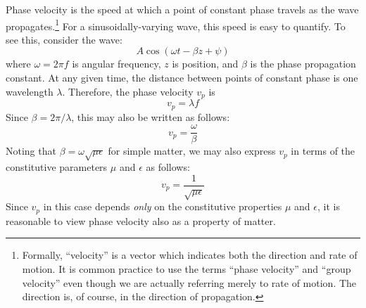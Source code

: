 

\label{m0176_Phase_and_Group_Velocity} %

Phase velocity is the speed at which a point of constant phase travels as the wave propagates.\footnote{Formally, ``velocity'' is a vector which indicates both the direction and rate of motion.  It is common practice to use the terms ``phase velocity'' and ``group velocity'' even though we are actually referring merely to rate of motion.  The direction is, of course, in the direction of propagation.}
For a sinusoidally-varying wave, this speed is easy to quantify.
To see this, consider the wave:
%
\begin{equation}
A\cos\left(\omega t -\beta z + \psi \right)
\label{m0176_ewzt}
\end{equation}
%
where $\omega=2\pi f$ is angular frequency, $z$ is position, and $\beta$ is the phase propagation constant.
At any given time, the distance between points of constant phase is one wavelength $\lambda$.
Therefore, the phase velocity $v_p$ is
%
\begin{equation}
v_p = \lambda f 
\label{m0176_evp}
\end{equation}
%
Since $\beta=2\pi/\lambda$, this may also be written as follows:
%
\begin{equation}
\boxed{
v_p = \frac{\omega}{\beta} 
}
\label{m0176_evp2}
\end{equation}
%
Noting that $\beta=\omega\sqrt{\mu\epsilon}$ for simple matter, we may also express $v_p$ in terms of the constitutive parameters $\mu$ and $\epsilon$ as follows:
%
\begin{equation}
v_p = \frac{1}{\sqrt{\mu\epsilon}}
\label{m0176_evpm}
\end{equation}
%
Since $v_p$ in this case depends \emph{only} on the constitutive properties $\mu$ and $\epsilon$, it is reasonable to view phase velocity also as a property of matter.

